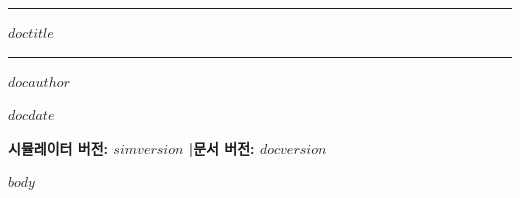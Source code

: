 \documentclass[11pt,a4paper]{article}
\begin{document}
\begin{titlepage}
\centering
\vspace*{3cm}
{\color{headerrulecolor}\rule{\textwidth}{2pt}}
\vspace{0.8cm}
{\Huge\bfseries\color{sectioncolor} $doctitle$\par}
\vspace{0.8cm}
{\color{headerrulecolor}\rule{\textwidth}{1pt}}
\vspace{1.5cm}
{\Large $docauthor$\par}
\vspace{0.8cm}
{\large $docdate$\par}
\vspace{2cm}
{\large\bfseries\color{subsectioncolor} 시뮬레이터 버전: $simversion$ \quad|\quad 문서 버전: $docversion$\par}
\vfill
\end{titlepage}
\tableofcontents
\newpage
$body$
\end{document}
